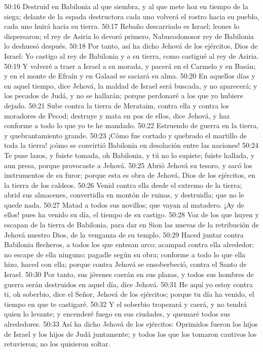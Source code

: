 50:16 Destruid en Babilonia al que siembra, y al que mete hoz en tiempo de la siega; delante de la espada destructora cada uno volverá el rostro hacia su pueblo, cada uno huirá hacia su tierra. 
50:17 Rebaño descarriado es Israel; leones lo dispersaron; el rey de Asiria lo devoró primero, Nabucodonosor rey de Babilonia lo deshuesó después. 
50:18 Por tanto, así ha dicho Jehová de los ejércitos, Dios de Israel: Yo castigo al rey de Babilonia y a su tierra, como castigué al rey de Asiria. 
50:19 Y volveré a traer a Israel a su morada, y pacerá en el Carmelo y en Basán; y en el monte de Efraín y en Galaad se saciará su alma. 
50:20 En aquellos días y en aquel tiempo, dice Jehová, la maldad de Israel será buscada, y no aparecerá; y los pecados de Judá, y no se hallarán; porque perdonaré a los que yo hubiere dejado. 
50:21 Sube contra la tierra de Merataim, contra ella y contra los moradores de Pecod; destruye y mata en pos de ellos, dice Jehová, y haz conforme a todo lo que yo te he mandado. 
50:22 Estruendo de guerra en la tierra, y quebrantamiento grande. 
50:23 ¡Cómo fue cortado y quebrado el martillo de toda la tierra! ¡cómo se convirtió Babilonia en desolación entre las naciones! 
50:24 Te puse lazos, y fuiste tomada, oh Babilonia, y tú no lo supiste; fuiste hallada, y aun presa, porque provocaste a Jehová. 
50:25 Abrió Jehová su tesoro, y sacó los instrumentos de su furor; porque esta es obra de Jehová, Dios de los ejércitos, en la tierra de los caldeos. 
50:26 Venid contra ella desde el extremo de la tierra; abrid sus almacenes, convertidla en montón de ruinas, y destruidla; que no le quede nada. 
50:27 Matad a todos sus novillos; que vayan al matadero. ¡Ay de ellos! pues ha venido su día, el tiempo de su castigo. 
50:28 Voz de los que huyen y escapan de la tierra de Babilonia, para dar en Sion las nuevas de la retribución de Jehová nuestro Dios, de la venganza de su templo. 
50:29 Haced juntar contra Babilonia flecheros, a todos los que entesan arco; acampad contra ella alrededor; no escape de ella ninguno; pagadle según su obra; conforme a todo lo que ella hizo, haced con ella; porque contra Jehová se ensoberbeció, contra el Santo de Israel. 
50:30 Por tanto, sus jóvenes caerán en sus plazas, y todos sus hombres de guerra serán destruidos en aquel día, dice Jehová. 
50:31 He aquí yo estoy contra ti, oh soberbio, dice el Señor, Jehová de los ejércitos; porque tu día ha venido, el tiempo en que te castigaré. 
50:32 Y el soberbio tropezará y caerá, y no tendrá quien lo levante; y encenderé fuego en sus ciudades, y quemaré todos sus alrededores. 
50:33 Así ha dicho Jehová de los ejércitos: Oprimidos fueron los hijos de Israel y los hijos de Judá juntamente; y todos los que los tomaron cautivos los retuvieron; no los quisieron soltar. 
